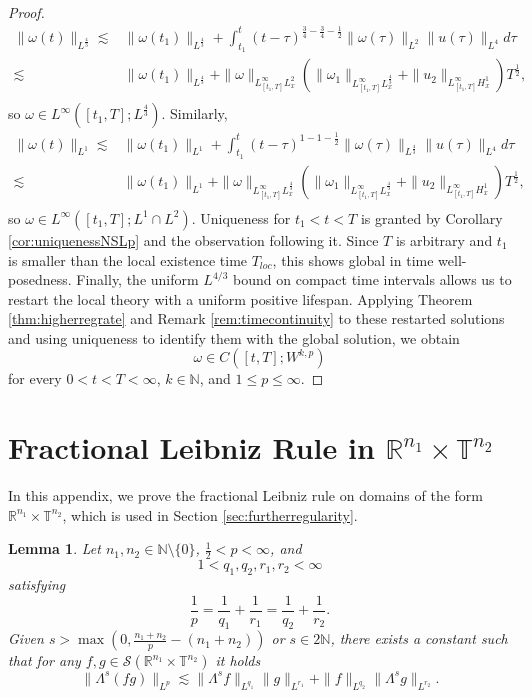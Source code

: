 \documentclass[11pt,a4paper]{article}
\newcommand{\w}{\omega}
\newcommand{\N}{\mathbb{N}}
\newcommand{\R}{\mathbb{R}}
\newcommand{\T}{\mathbb{T}}
\newcommand{\norm}[1]{\|#1\|}
\newtheorem{lemma}[thm]{Lemma}
\begin{document}
\begin{proof}
$$
\begin{aligned}
\norm{\w(t)}_{L^{\frac{4}{3}}}
\lesssim & \norm{\w(t_1)}_{L^\frac{4}{3}}+\int_{t_1}^t (t-\tau)^{\frac{3}{4}-\frac{3}{4}-\frac{1}{2}}\norm{\w(\tau)}_{L^{2}}\norm{u(\tau)}_{L^4}d\tau\\
\lesssim & \norm{\w(t_1)}_{L^\frac{4}{3}}+\norm{\w}_{L^\infty_{[t_1,T]}L_x^{2}}(\norm{\w_1}_{L^\infty_{[t_1,T]}L^{\frac43}_x}+\norm{u_2}_{L^\infty_{[t_1,T]}H^1_x})T^\frac{1}{2},\\
\end{aligned}
$$
so $\w\in L^\infty([t_1,T];L^\frac{4}{3})$. Similarly, 
$$
\begin{aligned}
\norm{\w(t)}_{L^{1}}
\lesssim & \norm{\w(t_1)}_{L^1}+\int_{t_1}^t (t-\tau)^{1-1-\frac{1}{2}}\norm{\w(\tau)}_{L^{\frac{4}{3}}}\norm{u(\tau)}_{L^4}d\tau\\
\lesssim & \norm{\w(t_1)}_{L^1}+\norm{\w}_{L^\infty_{[t_1,T]}L_x^{\frac{4}{3}}}(\norm{\w_1}_{L^\infty_{[t_1,T]}L^{\frac43}_x}+\norm{u_2}_{L^\infty_{[t_1,T]}H^1_x})T^\frac{1}{2},\\
\end{aligned}
$$
so $\w\in L^\infty([t_1,T];L^1\cap L^2)$. 
Uniqueness for $t_1<t<T$ is granted by Corollary \ref{cor:uniquenessNSLp} and the observation following it. Since $T$ is arbitrary and $t_1$ is smaller than the local existence time $T_{loc}$, this shows global in time well-posedness. Finally, the uniform $L^{4/3}$ bound on compact time intervals allows
us to restart the local theory with a uniform positive lifespan.
Applying Theorem \ref{thm:higherregrate} and Remark \ref{rem:timecontinuity} to these restarted solutions and using uniqueness
to identify them with the global solution, we obtain
$$
\omega\in C([t,T];W^{k,p})
$$
for every $0<t<T<\infty$, $k\in\mathbb N$, and
$1\leq p\leq \infty$.
\end{proof}

\appendix

\section{Fractional Leibniz Rule in $\mathbb{R}^{n_1}\times\T^{n_2}$}
In this appendix, we prove the fractional Leibniz rule on domains of the form $\mathbb{R}^{n_1}\times\mathbb{T}^{n_2}$, which is used in Section \ref{sec:furtherregularity}.
\begin{lemma}\label{lem:KatoPonce}
Let $n_1,n_2\in \N\setminus{\{0\}}$, $\frac{1}{2}<p<\infty$, and
$$
1<q_1,q_2,r_1,r_2<\infty
$$
satisfying
$$
\frac{1}{p}
=
\frac{1}{q_1}+\frac{1}{r_1}
=
\frac{1}{q_2}+\frac{1}{r_2}.
$$
Given $s>\max(0, \frac{n_1+n_2}{p}-(n_1+n_2))$ or $s\in 2\mathbb{N}$, there exists a constant such that
for any $f,g\in \mathscr{S}(\R^{n_1}\times\T^{n_2})$ it holds
$$
\|\Lambda^s(fg)\|_{L^p}
\lesssim
\|\Lambda^s f\|_{L^{q_1}}\|g\|_{L^{r_1}}
+
\|f\|_{L^{q_2}}\|\Lambda^s g\|_{L^{r_2}}.
$$
\end{lemma}
\end{document}
